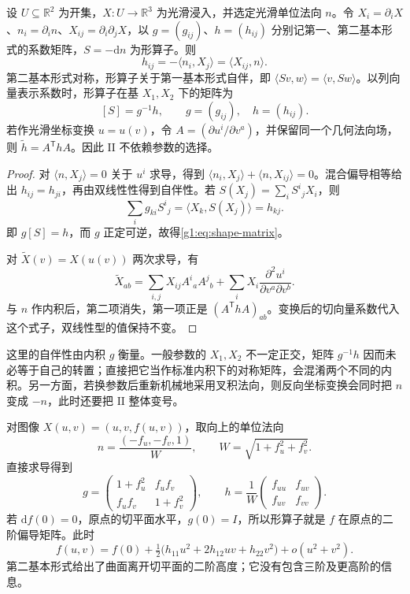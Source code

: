 \begin{proposition}\label{g1:prop:shape-self-adjoint}
	设 \(U\subseteq\mathbb R^2\) 为开集，\(X:U\to\mathbb R^3\) 为光滑浸入，并选定光滑单位法向 \(n\)。令 \(X_i=\partial_iX\)、\(n_i=\partial_in\)、\(X_{ij}=\partial_i\partial_jX\)，以 \(g=(g_{ij})\)、\(h=(h_{ij})\) 分别记第一、第二基本形式的系数矩阵，\(S=-\mathrm{d}n\) 为形算子。则
	\begin{equation}\label{g1:eq:second-form-coefficients}
		h_{ij}=-\langle n_i,X_j\rangle=\langle X_{ij},n\rangle.
	\end{equation}
	第二基本形式对称，形算子关于第一基本形式自伴，即 \(\langle Sv,w\rangle=\langle v,Sw\rangle\)。以列向量表示系数时，形算子在基 \(X_1,X_2\) 下的矩阵为
	\begin{equation}\label{g1:eq:shape-matrix}
		[S]=g^{-1}h,\qquad g=(g_{ij}),\quad h=(h_{ij}).
	\end{equation}
	若作光滑坐标变换 \(u=u(v)\)，令 \(A=(\partial u^i/\partial v^a)\)，并保留同一个几何法向场，则 \(\widetilde h=A^{\mathsf T}hA\)。因此 \(\mathrm{II}\) 不依赖参数的选择。
\end{proposition}
\begin{proof}
	对 \(\langle n,X_j\rangle=0\) 关于 \(u^i\) 求导，得到 \(\langle n_i,X_j\rangle+\langle n,X_{ij}\rangle=0\)。混合偏导相等给出 \(h_{ij}=h_{ji}\)，再由双线性性得到自伴性。若 \(S(X_j)=\sum_i S^i{}_jX_i\)，则
	\[
		\sum_i g_{ki}S^i{}_j=\langle X_k,S(X_j)\rangle=h_{kj}.
	\]
	即 \(g[S]=h\)，而 \(g\) 正定可逆，故得\eqref{g1:eq:shape-matrix}。

	对 \(\widetilde X(v)=X(u(v))\) 两次求导，有
	\[
		\widetilde X_{ab}=\sum_{i,j}X_{ij}A^i{}_aA^j{}_b+\sum_i X_i\frac{\partial^2u^i}{\partial v^a\partial v^b}.
	\]
	与 \(n\) 作内积后，第二项消失，第一项正是 \((A^{\mathsf T}hA)_{ab}\)。变换后的切向量系数代入这个式子，双线性型的值保持不变。
\end{proof}

这里的自伴性由内积 \(g\) 衡量。一般参数的 \(X_1,X_2\) 不一定正交，矩阵 \(g^{-1}h\) 因而未必等于自己的转置；直接把它当作标准内积下的对称矩阵，会混淆两个不同的内积。另一方面，若换参数后重新机械地采用叉积法向，则反向坐标变换会同时把 \(n\) 变成 \(-n\)，此时还要把 \(\mathrm{II}\) 整体变号。

\begin{example}\label{g1:exm:graph-second-form}
	对图像 \(X(u,v)=(u,v,f(u,v))\)，取向上的单位法向
	\[
		n=\frac{(-f_u,-f_v,1)}W,\qquad W=\sqrt{1+f_u^2+f_v^2}.
	\]
	直接求导得到
	\[
		g=\begin{pmatrix}1+f_u^2&f_uf_v\\f_uf_v&1+f_v^2\end{pmatrix},
		\qquad
		h=\frac1W\begin{pmatrix}f_{uu}&f_{uv}\\f_{uv}&f_{vv}\end{pmatrix}.
	\]
	若 \(\mathrm df(0)=0\)，原点的切平面水平，\(g(0)=I\)，所以形算子就是 \(f\) 在原点的二阶偏导矩阵。此时
	\[
		f(u,v)=f(0)+\tfrac12\bigl(h_{11}u^2+2h_{12}uv+h_{22}v^2\bigr)+o(u^2+v^2).
	\]
	第二基本形式给出了曲面离开切平面的二阶高度；它没有包含三阶及更高阶的信息。
\end{example}

